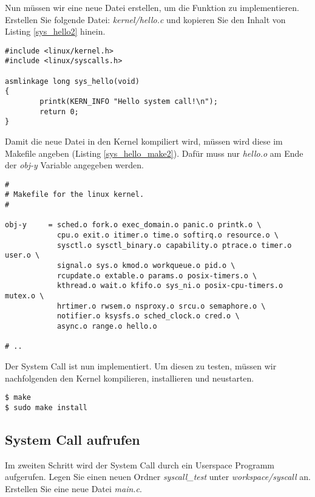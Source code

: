 Nun müssen wir eine neue Datei erstellen, um die Funktion zu implementieren. Erstellen Sie folgende Datei: \emph{kernel/hello.c}
und kopieren Sie den Inhalt von Listing \ref{sys_hello2} hinein.

\begin{lstlisting}[label=sys_hello2,caption=kernel/hello.c]
#include <linux/kernel.h>
#include <linux/syscalls.h>

asmlinkage long sys_hello(void)
{
        printk(KERN_INFO "Hello system call!\n");
        return 0;
}
\end{lstlisting}

Damit die neue Datei in den Kernel kompiliert wird, müssen wird diese im Makefile angeben (Listing \ref{sys_hello_make2}).
Dafür muss nur \emph{hello.o} am Ende der \emph{obj-y} Variable angegeben werden.

\begin{lstlisting}[label=sys_hello_make2,caption=kernel/Makefile]
#
# Makefile for the linux kernel.
#

obj-y     = sched.o fork.o exec_domain.o panic.o printk.o \
            cpu.o exit.o itimer.o time.o softirq.o resource.o \
            sysctl.o sysctl_binary.o capability.o ptrace.o timer.o user.o \
            signal.o sys.o kmod.o workqueue.o pid.o \
            rcupdate.o extable.o params.o posix-timers.o \
            kthread.o wait.o kfifo.o sys_ni.o posix-cpu-timers.o mutex.o \
            hrtimer.o rwsem.o nsproxy.o srcu.o semaphore.o \
            notifier.o ksysfs.o sched_clock.o cred.o \
            async.o range.o hello.o

# ..
\end{lstlisting}

Der System Call ist nun implementiert. Um diesen zu testen, müssen wir nachfolgenden den Kernel kompilieren,
installieren und neustarten.

\begin{lstlisting}
$ make
$ sudo make install
\end{lstlisting}

\subsection{System Call aufrufen}

Im zweiten Schritt wird der System Call durch ein Userspace Programm aufgerufen. Legen Sie einen neuen Ordner \emph{syscall\_test} unter
\emph{workspace/syscall} an. Erstellen Sie eine neue Datei \emph{main.c}. \\

